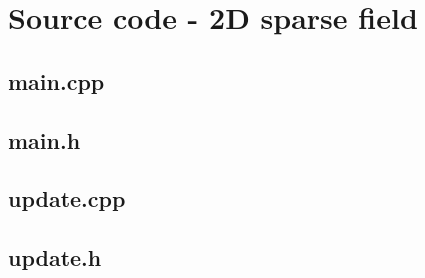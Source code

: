 \clearpage
\section*{Source code - 2D sparse field}
\subsection*{main.cpp}
\subsection*{main.h}

\subsection*{update.cpp}

\subsection*{update.h}

\clearpage